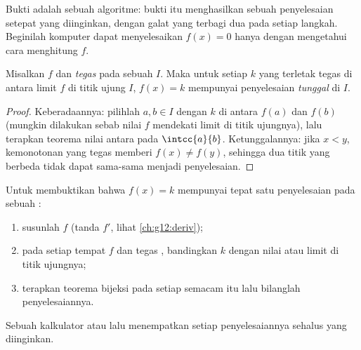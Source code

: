 \begin{remark}
Bukti  adalah sebuah algoritme: bukti itu menghasilkan 
sebuah penyelesaian setepat yang diinginkan, dengan galat yang terbagi dua pada
setiap langkah. Beginilah komputer dapat menyelesaikan $f(x) = 0$ hanya dengan
mengetahui cara menghitung $f$.
\end{remark}

\begin{theorem}\label{thm:g12:limcont:bijection}
Misalkan $f$  dan \emph{tegas } pada sebuah  $I$. Maka
untuk setiap $k$ yang terletak tegas di antara limit $f$ di titik ujung $I$,
 $f(x) = k$ mempunyai penyelesaian \emph{tunggal} di $I$.
\end{theorem}

\begin{proof}
Keberadaannya: pilihlah $a, b \in I$ dengan $k$ di antara $f(a)$ dan $f(b)$
(mungkin dilakukan sebab nilai $f$ mendekati limit di titik ujungnya), lalu
terapkan teorema nilai antara pada $\intcc{a}{b}$. Ketunggalannya: jika
$x < y$, kemonotonan yang tegas memberi $f(x) \neq f(y)$, sehingga dua titik
yang berbeda tidak dapat sama-sama menjadi penyelesaian.
\end{proof}

\begin{method}[Menyelesaikan $f(x) = k$ dengan teorema bijeksi]\label{met:g12:limcont:bijection}
Untuk membuktikan bahwa $f(x) = k$ mempunyai tepat satu penyelesaian pada sebuah :
\begin{enumerate}
  \item susunlah  $f$ (tanda $f'$, lihat
        \cref{ch:g12:deriv});
  \item pada setiap  tempat $f$  dan tegas ,
        bandingkan $k$ dengan nilai atau limit di titik ujungnya;
  \item terapkan teorema bijeksi pada setiap  semacam itu lalu
        bilanglah penyelesaiannya.
\end{enumerate}
Sebuah kalkulator atau  lalu menempatkan setiap penyelesaiannya sehalus yang diinginkan.
\end{method}

